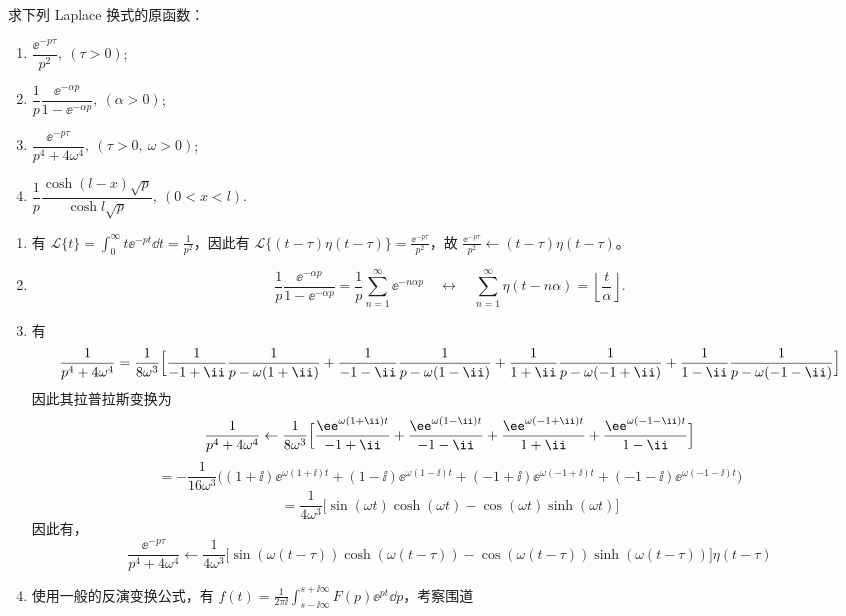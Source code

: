 \begin{question}
求下列 Laplace 换式的原函数：
\begin{enumerate}
  \item \(\dfrac{\ee^{-p\tau}}{p^2},\ (\tau>0)\);
  \item \(\dfrac1p\dfrac{\ee^{-\alpha p}}{1-\ee^{-\alpha p}},\ (\alpha>0)\);
  \item \(\dfrac{\ee^{-p\tau}}{p^4+4\omega^4},\ (\tau>0,\ \omega>0)\);
  \item \(\dfrac1p\dfrac{\cosh(l-x)\sqrt p}{\cosh l\sqrt p},\ (0<x<l)\).
\end{enumerate}
\begin{solution}

\begin{enumerate}
  \item 有 \(\displaystyle\mathcal{L}\{t\} = \int_0^\infty t \ee^{-p t}\dd{t} = \frac1{p^2}\)，因此有 \(\displaystyle\mathcal{L}\{(t-\tau)\eta(t-\tau)\} = \frac{\ee^{-p\tau}}{p^2}\)，故 \(\displaystyle\frac{\ee^{-p\tau}}{p^2} \gets (t-\tau)\eta(t-\tau)\)。

  \item
  \[
  \frac1p\frac{\ee^{-\alpha p}}{1-\ee^{-\alpha p}}
  =\frac1p\sum_{n=1}^{\infty}\ee^{-n\alpha p}
  \quad\longleftrightarrow\quad
  \sum_{n=1}^{\infty}\eta(t-n\alpha)
  =\left\lfloor\frac{t}{\alpha}\right\rfloor.
  \]

  \item 有 \[ \frac1{p^4+4\omega^4} = \frac1{8\omega^3}\Bigl[\frac1{-1+\ii}\frac1{p-\omega(1+\ii)}+\frac1{-1-\ii}\frac1{p-\omega(1-\ii)}+\frac1{1+\ii}\frac1{p-\omega(-1+\ii)}+\frac1{1-\ii}\frac1{p-\omega(-1-\ii)}\Bigr] \]因此其拉普拉斯变换为 \[ \frac1{p^4+4\omega^4} \gets \frac1{8\omega^3}\Bigl[\frac{\ee^{\omega(1+\ii)t}}{-1+\ii}+\frac{\ee^{\omega(1-\ii)t}}{-1-\ii}+\frac{\ee^{\omega(-1+\ii)t}}{1+\ii}+\frac{\ee^{\omega(-1-\ii)t}}{1-\ii}\Bigr] \] \[ = -\frac1{16\omega^3}\bigl((1+\ii)\ee^{\omega(1+\ii)t}+(1-\ii)\ee^{\omega(1-\ii)t}+(-1+\ii)\ee^{\omega(-1+\ii)t}+(-1-\ii)\ee^{\omega(-1-\ii)t}\bigr) \] \[ =\frac1{4\omega^3}\bigl[\sin(\omega t)\cosh(\omega t)-\cos(\omega t)\sinh(\omega t)\bigr] \]因此有，\[ \frac{\ee^{-p\tau}}{p^4+4\omega^4} \gets \frac1{4\omega^3}\bigl[\sin(\omega(t-\tau))\cosh(\omega(t-\tau))-\cos(\omega(t-\tau))\sinh(\omega(t-\tau))\bigr]\eta(t-\tau) \]

  \item 使用一般的反演变换公式，有 \(\displaystyle f(t)=\frac1{2\pi\ii}\int_{s-\ii\infty}^{s+\ii\infty} F(p) \ee^{p t}\dd{p}\)，考察围道


\end{enumerate}
\end{solution}
\end{question}
